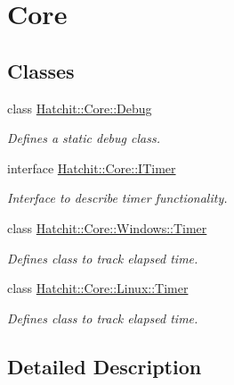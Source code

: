 \hypertarget{group__Core}{}\section{Core}
\label{group__Core}
\subsection*{Classes}
\begin{DoxyCompactItemize}
\item 
class \hyperlink{classHatchit_1_1Core_1_1Debug}{Hatchit\+::\+Core\+::\+Debug}
\begin{DoxyCompactList}\small\item\em Defines a static debug class. \end{DoxyCompactList}\item 
interface \hyperlink{classHatchit_1_1Core_1_1ITimer}{Hatchit\+::\+Core\+::\+I\+Timer}
\begin{DoxyCompactList}\small\item\em Interface to describe timer functionality. \end{DoxyCompactList}\item 
class \hyperlink{classHatchit_1_1Core_1_1Windows_1_1Timer}{Hatchit\+::\+Core\+::\+Windows\+::\+Timer}
\begin{DoxyCompactList}\small\item\em Defines class to track elapsed time. \end{DoxyCompactList}\item 
class \hyperlink{classHatchit_1_1Core_1_1Linux_1_1Timer}{Hatchit\+::\+Core\+::\+Linux\+::\+Timer}
\begin{DoxyCompactList}\small\item\em Defines class to track elapsed time. \end{DoxyCompactList}\end{DoxyCompactItemize}


\subsection{Detailed Description}
